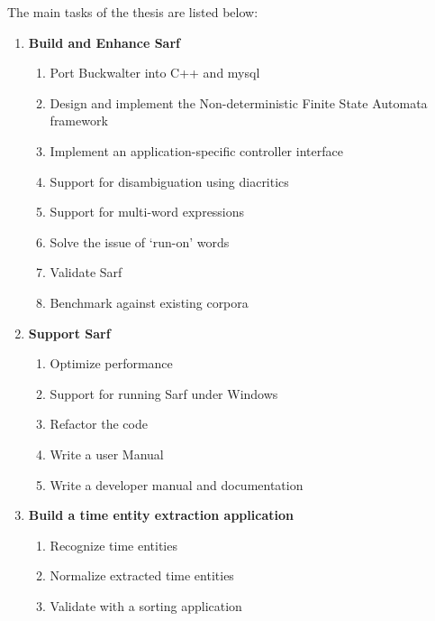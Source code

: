 \documentclass[a4,12pt]{report}
\begin{document}
The main tasks of the thesis are listed below: \\
\begin{enumerate}[1.]
\item \textbf{Build and Enhance Sarf} \label{I:BuildSarf}
	\begin{enumerate}
	\item Port Buckwalter into C++ and mysql \label{I:portBuckwalter}
	\item Design and implement the Non-deterministic Finite State Automata framework \label{I:ndfsa}
	\item Implement an application-specific controller interface \label{I:applicationController}
	\item Support for disambiguation using diacritics \label{I:diacritics}
	\item Support for multi-word expressions \label{I:multiword}
	\item Solve the issue of `run-on' words \label{I:runon}
	\item Validate Sarf \label{I:validateSarf}
	\item Benchmark against existing corpora \label{I:benchMark}
	\end{enumerate}
\item \textbf{Support Sarf} \label{I:SupportSarf}
	\begin{enumerate}
	\item Optimize performance \label{I:optimizeSarf}
	\item Support for running Sarf under Windows \label{I:SarfonWindows}
	\item Refactor the code \label{I:RefactorSarf}
	\item Write a user Manual \label{I:SarfUserManual}
	\item Write a developer manual and documentation \label{I:SarfDeveloperManual}
	\end{enumerate}
\item \textbf{Build a time entity extraction application} \label{I:TimeEntityExtractor}
	\begin{enumerate}
	\item Recognize time entities \label{I:TimeEntityRecognition}
	\item Normalize extracted time entities \label{I:TimeEntityNormalization}
	\item Validate with a sorting application \label{I:TimeEntityValidation}
	\end{enumerate}

\end{enumerate}
\end{document}
